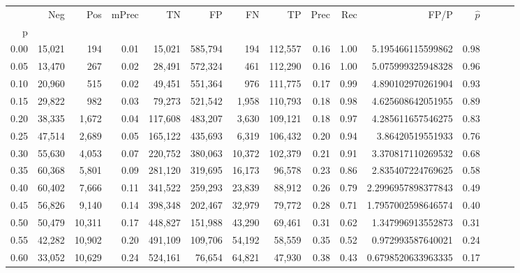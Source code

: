 \begin{tabular}{rrrrrrrrrrrrrrr}
\toprule
{} &     Neg &     Pos & mPrec &       TN &       FP &       FN &       TP &  Prec &   Rec &                  FP/P & $\hat{p}$ \\
p    &         &         &       &          &          &          &          &       &       &                       &           \\
\midrule
0.00 &  15,021 &     194 &  0.01 &   15,021 &  585,794 &      194 &  112,557 &  0.16 &  1.00 &     5.195466115599862 &      0.98 \\
0.05 &  13,470 &     267 &  0.02 &   28,491 &  572,324 &      461 &  112,290 &  0.16 &  1.00 &     5.075999325948328 &      0.96 \\
0.10 &  20,960 &     515 &  0.02 &   49,451 &  551,364 &      976 &  111,775 &  0.17 &  0.99 &     4.890102970261904 &      0.93 \\
0.15 &  29,822 &     982 &  0.03 &   79,273 &  521,542 &    1,958 &  110,793 &  0.18 &  0.98 &     4.625608642051955 &      0.89 \\
0.20 &  38,335 &   1,672 &  0.04 &  117,608 &  483,207 &    3,630 &  109,121 &  0.18 &  0.97 &     4.285611657546275 &      0.83 \\
0.25 &  47,514 &   2,689 &  0.05 &  165,122 &  435,693 &    6,319 &  106,432 &  0.20 &  0.94 &      3.86420519551933 &      0.76 \\
0.30 &  55,630 &   4,053 &  0.07 &  220,752 &  380,063 &   10,372 &  102,379 &  0.21 &  0.91 &     3.370817110269532 &      0.68 \\
0.35 &  60,368 &   5,801 &  0.09 &  281,120 &  319,695 &   16,173 &   96,578 &  0.23 &  0.86 &     2.835407224769625 &      0.58 \\
0.40 &  60,402 &   7,666 &  0.11 &  341,522 &  259,293 &   23,839 &   88,912 &  0.26 &  0.79 &    2.2996957898377843 &      0.49 \\
0.45 &  56,826 &   9,140 &  0.14 &  398,348 &  202,467 &   32,979 &   79,772 &  0.28 &  0.71 &    1.7957002598646574 &      0.40 \\
0.50 &  50,479 &  10,311 &  0.17 &  448,827 &  151,988 &   43,290 &   69,461 &  0.31 &  0.62 &     1.347996913552873 &      0.31 \\
0.55 &  42,282 &  10,902 &  0.20 &  491,109 &  109,706 &   54,192 &   58,559 &  0.35 &  0.52 &     0.972993587640021 &      0.24 \\
0.60 &  33,052 &  10,629 &  0.24 &  524,161 &   76,654 &   64,821 &   47,930 &  0.38 &  0.43 &    0.6798520633963335 &      0.17 \\

\end{tabular}
